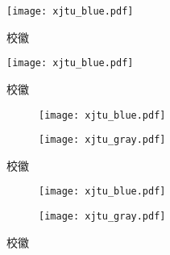 
\begin{texcodeonly}[]{}
  \begin{figure}[H]
    \centering
    \texttt{[image: xjtu\_blue.pdf]}
    \caption{校徽}
  \end{figure}
\end{texcodeonly}

\begin{figure}[H]
  \centering
  \texttt{[image: xjtu\_blue.pdf]}
  \caption{校徽}
\end{figure}



\begin{texcodeonly}[]{}
  \begin{figure}[H]
    \begin{subfigure}[b]{0.49\linewidth}
        \centering
        \texttt{[image: xjtu\_blue.pdf]}
    \end{subfigure}
    \begin{subfigure}[b]{0.49\linewidth}
        \centering
        \texttt{[image: xjtu\_gray.pdf]}
        \label{subfig:icon}
    \end{subfigure}
    \caption{校徽}
  \end{figure}
\end{texcodeonly}

\begin{figure}[H]
  \begin{subfigure}[b]{0.49\linewidth}
      \centering
      \texttt{[image: xjtu\_blue.pdf]}
  \end{subfigure}
  \begin{subfigure}[b]{0.49\linewidth}
      \centering
      \texttt{[image: xjtu\_gray.pdf]}
      \label{subfig:icon}
  \end{subfigure}
  \caption{校徽}
\end{figure}


\newcommand{\subfigg}{
  \begin{subfigure}[b]{0.49\linewidth}
    \centering
    \texttt{[image: xjtu\_blue.pdf]}
    \subcaption{蓝色校徽}
  \end{subfigure}
}

